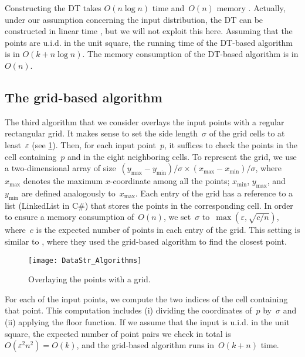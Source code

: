 Constructing the DT takes $O(n\log n)$ time 
and~$O(n)$ memory \parencite{Leach1992Delaunay}. 
Actually, under our assumption concerning the input 
distribution, the DT can be constructed in linear time
\parencite{Buchin2009_Delaunay}, 
but we will not exploit this here. 
Assuming that the points are u.i.d. in the unit square, 
the running time of the DT-based algorithm 
is in $O(k+n\log n)$. 
The memory consumption of the DT-based algorithm is in $O(n)$.


\subsection{The grid-based algorithm}
\label{sec:DataStr_GridAlgorithm}

The third algorithm that 
we consider overlays the input points with a 
regular rectangular grid. 
It makes sense to set the side length~$\sigma$ of the grid cells 
to at least~$\varepsilon$
(see \fig\ref{fig:DataStr_Grid}). 
Then, for each input point~$p$, 
it suffices to check the points in the cell containing~$p$ 
and in the eight neighboring cells. 
To represent the grid, 
we use a two-dimensional array of 
size~$(y_\mathrm{max}-y_\mathrm{min})/\sigma \times 
(x_\mathrm{max}-x_\mathrm{min})/\sigma $, 
where~$x_\mathrm{max}$ denotes the maximum $x$-coordinate 
among all the points; 
$x_\mathrm{min}$, $y_\mathrm{max}$, and~$y_\mathrm{min}$ are 
defined analogously to~$x_\mathrm{max}$. 
Each entry of the grid has a reference 
to a list (LinkedList in C\#) 
that stores the points in the corresponding cell. 
In order to ensure a memory consumption of~$O(n)$, 
we set~$\sigma$ to~$\max (\varepsilon ,\sqrt{c/n})$, 
where~$c$ is the expected number of points 
in each entry of the grid.
This setting is similar to \textcite{Bentley1980Closest}, 
where they used the grid-based algorithm to find the closest 
point.

\begin{figure}[tb]
\centering
\texttt{[image: DataStr\_Algorithms]}
\caption{Overlaying the points with a grid.}
\label{fig:DataStr_Grid}
\end{figure}

For each of the input points,
we compute the two indices of the cell containing that point.
This computation includes 
(i) dividing the coordinates of~$p$ by~$\sigma$ and 
(ii) applying the floor function. 
If we assume that the input is u.i.d. in the unit square, 
the expected number of point pairs 
we check in total is~$O(\varepsilon ^{2}n^{2})=O(k)$, 
and the grid-based algorithm runs in~$O(k+n)$ time.





